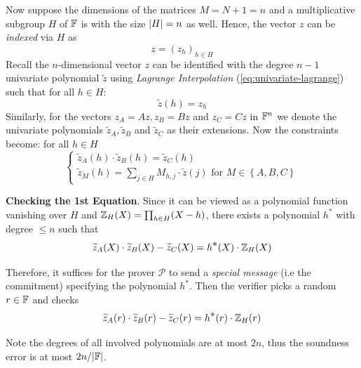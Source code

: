 \documentclass{article}
\begin{document}
Now suppose the dimensions of the matrices $M = N+1 = n$ and a multiplicative subgroup $H$ of $\mathbb{F}$ is with the size $\abs{H} = n$ as well. Hence, the vector $z$ can be \textit{indexed} via $H$ as
\begin{equation*}
z = \left( z_h \right)_{h \in H}
\end{equation*}
Recall the $n$-dimensional vector $z$ can be identified with the degree $n-1$ univariate polynomial $\widetilde{z}$ using \textit{Lagrange Interpolation} (\ref{eq:univariate-lagrange}) such that for all $h \in H$:
\begin{equation*}
\widetilde{z}(h) = z_{h}
\end{equation*}
Similarly, for the vectors $z_A = Az, z_B = Bz$ and $z_C = Cz$ in $\mathbb{F}^n$ we denote the univariate polynomials $\widetilde{z}_A, \widetilde{z}_B$ and $\widetilde{z}_C$ as their extensions. Now the constraints become: for all $h \in H$
\begin{equation*}
\begin{cases}
\widetilde{z}_A(h) \cdot \widetilde{z}_{B}(h) = \widetilde{z}_C(h) \\
\widetilde{z}_M(h) = \sum \limits_{j \in H} M_{h, j} \cdot \widetilde{z}(j) \text{ for } M \in \left\{ A, B, C \right\} 
\end{cases}
\end{equation*}

\textbf{Checking the 1st Equation}. Since it can be viewed as a polynomial function vanishing over $H$ and $\mathbb{Z}_H(X) = \prod_{h \in H}(X - h)$, there exists a polynomial $h^{\displaystyle *}$ with degree $\leq n$ such that
\begin{equation*}
\widetilde{z}_A(X) \cdot \widetilde{z}_{B}(X) - \widetilde{z}_C(X) = h^{\displaystyle *} (X) \cdot \mathbb{Z}_H(X)
\end{equation*}
 
Therefore, it suffices for the prover $\mathcal{P}$ to send a \textit{special message} (i.e the commitment) specifying the polynomial $h^{\displaystyle *}$. Then the verifier picks a random $r \in \mathbb{F}$ and checks 
\begin{equation*}
\widetilde{z}_A(r) \cdot \widetilde{z}_{B}(r) - \widetilde{z}_C(r) = h^{\displaystyle *} (r) \cdot \mathbb{Z}_H(r)
\end{equation*}

Note the degrees of all involved polynomials are at most $2n$, thus the soundness error is at most $2n / \abs{\mathbb{F}}$.
\end{document}
